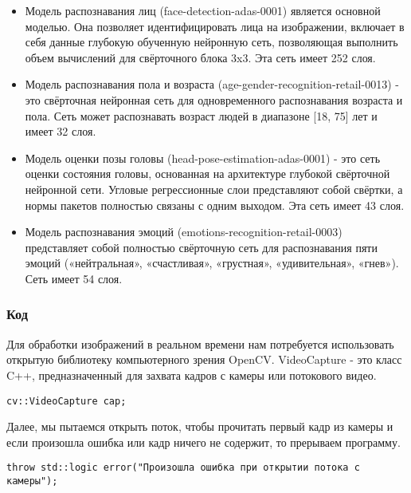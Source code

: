 \documentclass[12pt,a4paper]{scrartcl}
\begin{document}
			\begin{itemize}
				\item Модель распознавания лиц (face-detection-adas-0001) является основной моделью. Она позволяет идентифицировать лица на изображении, включает в себя данные глубокую обученную нейронную сеть, позволяющая выполнить объем вычислений для свёрточного блока 3x3. Эта сеть имеет 252 слоя\cite{bib:Face_Detect_Desc}.
				\item Модель распознавания пола и возраста (age-gender-recognition-retail-0013) - это свёрточная нейронная сеть для одновременного распознавания возраста и пола. Сеть может распознавать возраст людей в диапазоне [18, 75] лет и имеет 32 слоя\cite{bib:Age_Gender_Desc}.
				\item Модель оценки позы головы (head-pose-estimation-adas-0001) - это сеть оценки состояния головы, основанная на архитектуре глубокой свёрточной нейронной сети. Угловые регрессионные слои представляют собой свёртки, а нормы пакетов полностью связаны с одним выходом. Эта сеть имеет 43 слоя\cite{bib:Head_Pose_Desc}.
				\item Модель распознавания эмоций (emotions-recognition-retail-0003) представляет собой полностью свёрточную сеть для распознавания пяти эмоций («нейтральная», «счастливая», «грустная», «удивительная», «гнев»). Сеть имеет 54 слоя\cite{bib:Emotion_Recog_Desc}.
			\end{itemize}
		
		\subsubsection{Код}
		
			Для обработки изображений в реальном времени нам потребуется использовать открытую библиотеку компьютерного зрения OpenCV. VideoCapture - это
			класс C++, предназначенный для захвата кадров с камеры или потокового видео\cite{bib:CV_Video_Capture}.
			
			\begin{verbatim}
cv::VideoCapture cap;
			\end{verbatim}
			
			Далее, мы пытаемся открыть поток, чтобы прочитать первый кадр из камеры и если произошла ошибка или кадр ничего не содержит, то прерываем программу.
			
			\begin{verbatim}
throw std::logic error("Произошла ошибка при открытии потока с камеры");
			\end{verbatim}
			
\end{document}
